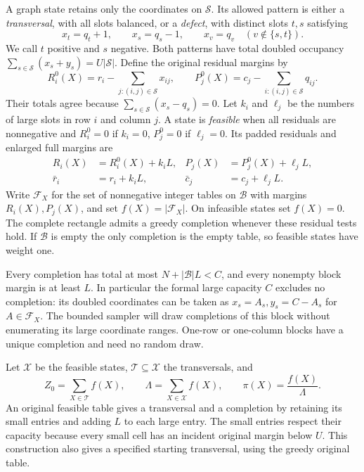 A graph state retains only the coordinates on $\mathcal S$.
Its allowed pattern is either a \emph{transversal}, with all slots
balanced, or a \emph{defect}, with distinct slots $t,s$ satisfying
\[
 x_t=q_t+1,\qquad x_s=q_s-1,
 \qquad x_v=q_v\quad(v\notin\{s,t\}).
\]
We call $t$ positive and $s$ negative.  Both patterns have total doubled
occupancy $\sum_{s\in\mathcal S}(x_s+y_s)=U|\mathcal S|$.
Define the original residual margins by
\[
 R_i^0(X)=r_i-\sum_{j:(i,j)\in\mathcal S}x_{ij},\qquad
 P_j^0(X)=c_j-\sum_{i:(i,j)\in\mathcal S}q_{ij}.
\]
Their totals agree because $\sum_{s\in\mathcal S}(x_s-q_s)=0$.
Let $k_i$ and $\ell_j$ be the numbers of large slots in row $i$ and
column $j$.  A state is \emph{feasible} when all residuals are nonnegative
and $R_i^0=0$ if $k_i=0$, $P_j^0=0$ if $\ell_j=0$.
Its padded residuals and enlarged full margins are
\begin{align*}
 R_i(X)&=R_i^0(X)+k_iL,& P_j(X)&=P_j^0(X)+\ell_jL,\\
 \bar r_i&=r_i+k_iL,&\bar c_j&=c_j+\ell_jL.
\end{align*}
Write $\mathcal F_X$ for the set of nonnegative integer tables on
$\mathcal B$ with margins $R_i(X),P_j(X)$, and set
$f(X)=|\mathcal F_X|$.  On infeasible states set $f(X)=0$.
The complete rectangle admits a greedy completion whenever these
residual tests hold.  If $\mathcal B$ is empty the only completion is
the empty table, so feasible states have weight one.

Every completion has total at most $N+|\mathcal B|L<C$, and every
nonempty block margin is at least $L$.  In particular the formal large
capacity $C$ excludes no completion: its doubled coordinates can be
taken as $x_s=A_s,y_s=C-A_s$ for $A\in\mathcal F_X$.
The bounded sampler will draw completions of this block without
enumerating its large coordinate ranges.  One-row or one-column blocks have a
unique completion and need no random draw.

Let $\mathcal X$ be the feasible states, $\mathcal T\subseteq\mathcal X$
the transversals, and
\begin{equation}\label{eq:graph-masses}
 Z_0=\sum_{X\in\mathcal T}f(X),\qquad
 \Lambda=\sum_{X\in\mathcal X}f(X),\qquad
 \pi(X)=\frac{f(X)}{\Lambda}.
\end{equation}
An original feasible table gives a transversal and a completion by
retaining its small entries and adding $L$ to each large entry.
The small entries respect their capacity because every small cell has
an incident original margin below $U$.  This construction also gives a
specified starting transversal, using the greedy original table.

